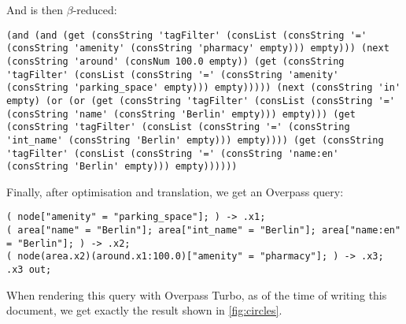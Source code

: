 \documentclass[main.tex]{subfiles}
\begin{document}
And is then $\beta$-reduced:
\begin{lstlisting}
(and (and (get (consString 'tagFilter' (consList (consString '=' (consString 'amenity' (consString 'pharmacy' empty))) empty))) (next (consString 'around' (consNum 100.0 empty)) (get (consString 'tagFilter' (consList (consString '=' (consString 'amenity' (consString 'parking_space' empty))) empty))))) (next (consString 'in' empty) (or (or (get (consString 'tagFilter' (consList (consString '=' (consString 'name' (consString 'Berlin' empty))) empty))) (get (consString 'tagFilter' (consList (consString '=' (consString 'int_name' (consString 'Berlin' empty))) empty)))) (get (consString 'tagFilter' (consList (consString '=' (consString 'name:en' (consString 'Berlin' empty))) empty))))))
\end{lstlisting}

Finally, after optimisation and translation, we get an Overpass query:
\begin{lstlisting}
( node["amenity" = "parking_space"]; ) -> .x1;
( area["name" = "Berlin"]; area["int_name" = "Berlin"]; area["name:en" = "Berlin"]; ) -> .x2;
( node(area.x2)(around.x1:100.0)["amenity" = "pharmacy"]; ) -> .x3;
.x3 out;
\end{lstlisting}

When rendering this query with Overpass Turbo, as of the time of writing this
document, we get exactly the result shown in \cref{fig:circles}.
\end{document}
